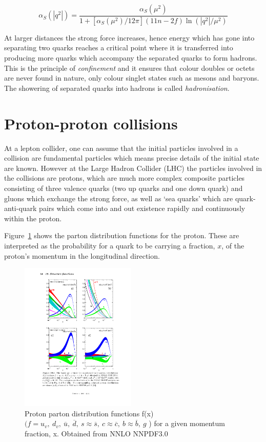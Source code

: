 \begin{equation}
\label{eqn:alphaSQCD}
\alpha_{S}\left( |q^{2}| \right) = \frac{\alpha_{S}\left( \mu^{2} \right)} {1 + \left[ \alpha_{S}\left( \mu^{2} \right)/12\pi \right]\left( 11n -2f \right) \ln \left(|q^{2}|/\mu^{2}\right)}
\end{equation}

At larger distances the strong force increases, hence energy which has gone into separating two quarks reaches a critical point where it is transferred into producing more quarks which accompany the separated quarks to form hadrons. This is the principle of \emph{confinement} and it ensures that colour doubles or octets are never found in nature, only colour singlet states such as mesons and baryons. The showering of separated quarks into hadrons is called \emph{hadronisation}.


\section{Proton-proton collisions}
At a lepton collider, one can assume that the initial particles involved in a collision are fundamental particles which means precise details of the initial state are known. However at the Large Hadron Collider (LHC) the particles involved in the collisions are protons, which are much more complex composite particles consisting of three valence quarks (two up quarks and one down quark) and gluons which exchange the strong force, as well as `sea quarks' which are quark-anti-quark pairs which come into and out existence rapidly and continuously within the proton.

Figure~\ref{fig:protonPDF} shows the parton distribution functions for the proton. These are interpreted as the probability for a quark to be carrying a fraction, $x$, of the proton's momentum in the longitudinal direction.

\begin{figure}[ht!]
\begin{center}
    \includegraphics[width=0.49\textwidth]{images/Theory/pdf3.pdf}
    \caption{Proton parton distribution functions f(x) $(f = u_{v},~ d_{v},~ \overline{u},~ \overline{d},~ s\approx\overline{s},~ c\approx\overline{c},~ b\approx\overline{b},~ g$ ) for a given momentum fraction, x. Obtained from NNLO NNPDF3.0~\cite{Ball2015}}
    \label{fig:protonPDF}
\end{center}
\end{figure}

